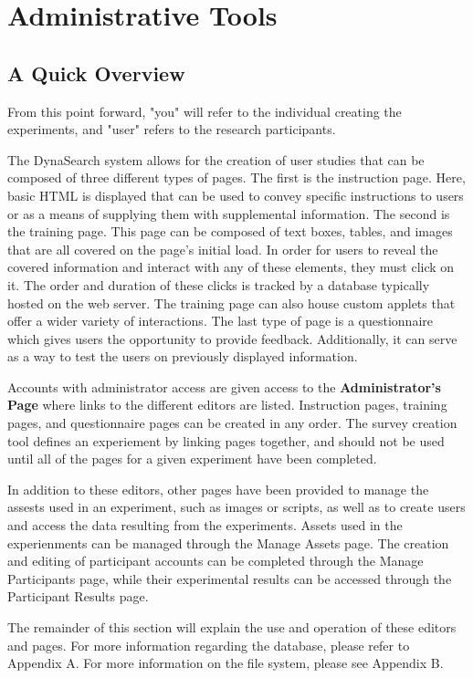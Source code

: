 \documentclass[article]{ij4uq}              %
\begin{document}
\section{Administrative Tools}

\subsection{A Quick Overview}
From this point forward, "you" will refer to the individual creating the experiments, and "user" refers to the research participants. 

The DynaSearch system allows for the creation of user studies that can be composed of three different types of pages. The first is the instruction page. Here, basic HTML is displayed that can be used to convey specific instructions to users or as a means of supplying them with supplemental information. The second is the training page. This page can be composed of text boxes, tables, and images that are all covered on the page's initial load.  In order for users to reveal the covered information and interact with any of these elements, they must click on it. The order and duration of these clicks is tracked by a database typically hosted on the web server. The training page can also house custom applets that offer a wider variety of interactions.  The last type of page is a questionnaire which gives users the opportunity to provide feedback.  Additionally, it can serve as a way to test the users on previously displayed information.

Accounts with administrator access are given access to the \textbf{Administrator's Page} where links to the different editors are listed. Instruction pages, training pages, and questionnaire pages can be created in any order. The survey creation tool defines an experiement by linking pages together, and should not be used until all of the pages for a given experiment have been completed.

In addition to these editors, other pages have been provided to manage the assests used in an experiment, such as images or scripts, as well as to create users and access the data resulting from the experiments.   Assets used in the experienments can be managed through the Manage Assets page.  The creation and editing of participant accounts can be completed through the Manage Participants page, while their experimental results can be accessed through the Participant Results page.

The remainder of this section will explain the use and operation of these editors and pages. For more information regarding the database, please refer to Appendix A. For more information on the file system, please see Appendix B.
\end{document}
